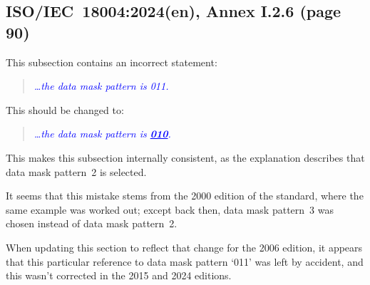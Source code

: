 \documentclass[a4paper,twoside]{article}
\newcommand{\shortstandard}{ISO/IEC~18004}
\newcommand{\standard}{\shortstandard:2024(en)}
\newcommand{\quotestandard}[1]{\textcolor{blue}{\textit{#1}}}
\newcommand{\ddd}{\dots}
\newcommand{\change}[1]{\underline{\textbf{#1}}}
\begin{document}
\subsection{\standard, Annex I.2.6 (page 90)}
\label{sec:dmp-changed-2}

This subsection contains an incorrect statement:

\begin{quote}
\quotestandard{\ddd the data mask pattern is 011.}
\end{quote}

This should be changed to:

\begin{quote}
\quotestandard{\ddd the data mask pattern is \change{010}.}
\end{quote}

This makes this subsection internally consistent, as the explanation describes that data mask pattern~2 is selected.

It seems that this mistake stems from the 2000 edition of the standard, where the same example was worked out;
except back then, data mask pattern~3 was chosen instead of data mask pattern~2.

When updating this section to reflect that change for the 2006 edition, it appears that this particular reference
to data mask pattern `011' was left by accident, and this wasn't corrected in the 2015 and 2024 editions.
\end{document}
